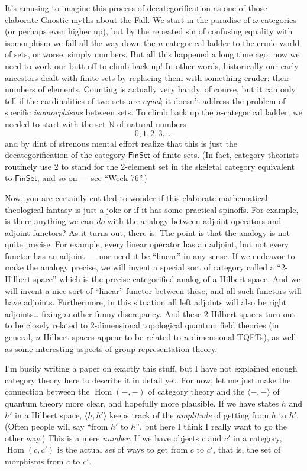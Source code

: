 \documentclass{article}
\begin{document}
It's amusing to imagine this process of decategorification as one of
those elaborate Gnostic myths about the Fall. We start in the paradise
of \(\omega\)-categories (or perhaps even higher up), but by the
repeated sin of confusing equality with isomorphism we fall all the way
down the \(n\)-categorical ladder to the crude world of sets, or worse,
simply numbers. But all this happened a long time ago: now we need to
work our butt off to climb back up! In other words, historically our
early ancestors dealt with finite sets by replacing them with something
cruder: their numbers of elements. Counting is actually very handy, of
course, but it can only tell if the cardinalities of two sets are
\emph{equal}; it doesn't address the problem of specific
\emph{isomorphisms} between sets. To climb back up the \(n\)-categorical
ladder, we needed to start with the set \(\mathbb{N}\) of natural
numbers \[0, 1, 2, 3, \ldots\] and by dint of strenous mental effort
realize that this is just the decategorification of the category
\(\mathsf{FinSet}\) of finite sets. (In fact, category-theorists
routinely use \(2\) to stand for the 2-element set in the skeletal
category equivalent to \(\mathsf{FinSet}\), and so on --- see
\protect\hyperlink{week76}{``Week 76''}.)

Now, you are certainly entitled to wonder if this elaborate
mathematical-theological fantasy is just a joke or if it has some
practical spinoffs. For example, is there anything we can \emph{do} with
the analogy between adjoint operators and adjoint functors? As it turns
out, there is. The point is that the analogy is not quite precise. For
example, every linear operator has an adjoint, but not every functor has
an adjoint --- nor need it be ``linear'' in any sense. If we endeavor to
make the analogy precise, we will invent a special sort of category
called a ``2-Hilbert space'' which is the precise categorified analog of
a Hilbert space. And we will invent a nice sort of ``linear'' functor
between these, and all such functors will have adjoints. Furthermore, in
this situation all left adjoints will also be right adjoints\ldots{}
fixing another funny discrepancy. And these 2-Hilbert spaces turn out to
be closely related to 2-dimensional topological quantum field theories
(in general, \(n\)-Hilbert spaces appear to be related to
\(n\)-dimensional TQFTs), as well as some interesting aspects of group
representation theory.

I'm busily writing a paper on exactly this stuff, but I have not
explained enough category theory here to describe it in detail yet. For
now, let me just make the connection between the
\(\operatorname{Hom}(-,-)\) of category theory and the
\(\langle -,-\rangle\) of quantum theory more clear, and hopefully more
plausible. If we have states \(h\) and \(h'\) in a Hilbert space,
\(\langle h,h'\rangle\) keeps track of the \emph{amplitude} of getting
from \(h\) to \(h'\). (Often people will say ``from \(h'\) to \(h\)'',
but here I think I really want to go the other way.) This is a mere
\emph{number}. If we have objects \(c\) and \(c'\) in a category,
\(\operatorname{Hom}(c,c')\) is the actual \emph{set} of ways to get
from \(c\) to \(c'\), that is, the set of morphisms from \(c\) to
\(c'\).
\end{document}
